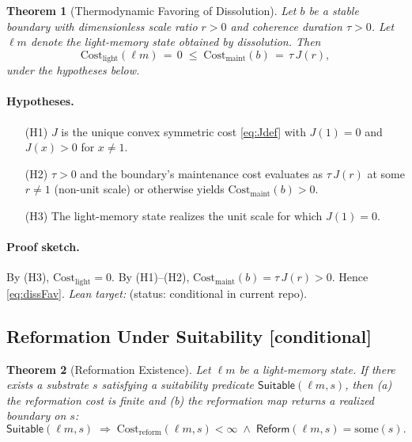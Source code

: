 \documentclass[11pt,letterpaper]{article}
\newcommand{\lean}[1]{\texttt{\detokenize{#1}}}
\newtheorem{theorem}{Theorem}[section]
\theoremstyle{definition}
\theoremstyle{remark}
\begin{document}
\begin{theorem}[Thermodynamic Favoring of Dissolution]\label{thm:dissolution}
Let \(b\) be a stable boundary with dimensionless scale ratio \(r>0\) and coherence duration \(\tau>0\). Let \(\ell m\) denote the light-memory state obtained by dissolution. Then
\begin{equation}
  \mathrm{Cost}_{\mathrm{light}}(\ell m) \,=\, 0 \;\le\; \mathrm{Cost}_{\mathrm{maint}}(b) \,=\, \tau\, J(r), \label{eq:dissFav}
\end{equation}
under the hypotheses below.
\end{theorem}

\paragraph{Hypotheses.}
\begin{itemize}
  \item[(H1)] \(J\) is the unique convex symmetric cost \eqref{eq:Jdef} with \(J(1)=0\) and \(J(x)>0\) for \(x\ne 1\).
  \item[(H2)] \(\tau>0\) and the boundary's maintenance cost evaluates as \(\tau\,J(r)\) at some \(r\ne 1\) (non-unit scale) or otherwise yields \(\mathrm{Cost}_{\mathrm{maint}}(b)>0\).
  \item[(H3)] The light-memory state realizes the unit scale for which \(J(1)=0\).
\end{itemize}

\paragraph{Proof sketch.}
By (H3), \(\mathrm{Cost}_{\mathrm{light}}=0\). By (H1)--(H2), \(\mathrm{Cost}_{\mathrm{maint}}(b)=\tau\,J(r)>0\). Hence \eqref{eq:dissFav}. \emph{Lean target:} \lean{dissolution_minimizes_cost} (status: conditional in current repo).

\subsection{Reformation Under Suitability \texorpdfstring{\textsf{[conditional]}}{[conditional]}}

\begin{theorem}[Reformation Existence]\label{thm:reformation}
Let \(\ell m\) be a light-memory state. If there exists a substrate \(s\) satisfying a suitability predicate \(\mathsf{Suitable}(\ell m, s)\), then (a) the reformation cost is finite and (b) the reformation map returns a realized boundary on \(s\):
\begin{equation}
  \mathsf{Suitable}(\ell m, s) \;\Rightarrow\; \mathrm{Cost}_{\mathrm{reform}}(\ell m, s)<\infty \;\wedge\; \mathsf{Reform}(\ell m, s)=\mathrm{some}(s). \label{eq:refSuit}
\end{equation}
\end{theorem}
\end{document}
